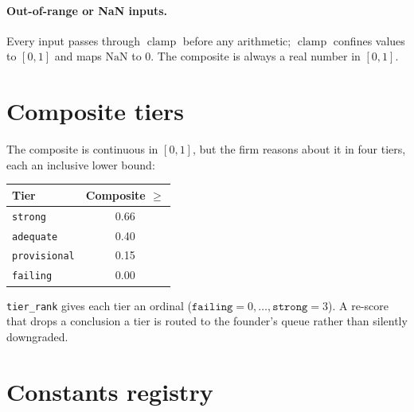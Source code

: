\documentclass[11pt]{article}
\newcommand{\code}[1]{\texttt{#1}}
\newcommand{\clip}{\operatorname{clamp}}
\begin{document}
\paragraph{Out-of-range or NaN inputs.} Every input passes through $\clip$
before any arithmetic; $\clip$ confines values to $[0,1]$ and maps
$\mathrm{NaN}$ to $0$. The composite is always a real number in $[0,1]$.

\section{Composite tiers}

The composite is continuous in $[0,1]$, but the firm reasons about it in four
tiers, each an inclusive lower bound:
\begin{center}
\begin{tabular}{lc}
\toprule
Tier & Composite $\ge$\\
\midrule
\texttt{strong}      & 0.66\\
\texttt{adequate}    & 0.40\\
\texttt{provisional} & 0.15\\
\texttt{failing}     & 0.00\\
\bottomrule
\end{tabular}
\end{center}
\code{tier\_rank} gives each tier an ordinal ($\texttt{failing}=0,\dots,
\texttt{strong}=3$). A re-score that drops a conclusion a tier is routed to
the founder's queue rather than silently downgraded.

\section{Constants registry}
\end{document}

